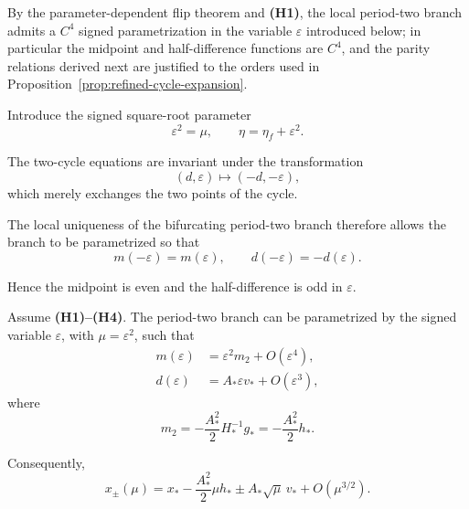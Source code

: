 By the parameter-dependent flip theorem
\cite{Kuznetsov2004,GuckenheimerHolmes1983} and \textbf{(H1)}, the
local period-two branch admits a $C^4$ signed parametrization in the
variable $\varepsilon$ introduced below; in particular the midpoint
and half-difference functions are $C^4$, and the parity relations
derived next are justified to the orders used in
Proposition~\ref{prop:refined-cycle-expansion}.

Introduce the signed square-root parameter
\begin{equation}
\varepsilon^2=\mu,
\qquad
\eta=\eta_f+\varepsilon^2.
\label{eq:epsilon-definition}
\end{equation}

The two-cycle equations are invariant under the transformation
\[
(d,\varepsilon)
\longmapsto
(-d,-\varepsilon),
\]
which merely exchanges the two points of the cycle.

The local uniqueness of the bifurcating period-two branch therefore
allows the branch to be parametrized so that
\begin{equation}
m(-\varepsilon)=m(\varepsilon),
\qquad
d(-\varepsilon)=-d(\varepsilon).
\label{eq:parity-md}
\end{equation}

Hence the midpoint is even and the half-difference is odd in
$\varepsilon$.

\begin{proposition}
\label{prop:refined-cycle-expansion}
Assume \textbf{(H1)--(H4)}.
The period-two branch can be parametrized by the signed variable
$\varepsilon$, with $\mu=\varepsilon^2$, such that
\begin{align}
m(\varepsilon)
&=
\varepsilon^2m_2
+
O(\varepsilon^4),
\label{eq:m-expansion}
\\
d(\varepsilon)
&=
A_*\varepsilon v_*
+
O(\varepsilon^3),
\label{eq:d-expansion}
\end{align}
where
\begin{equation}
m_2
=
-\frac{A_*^2}{2}H_*^{-1}g_*
=
-\frac{A_*^2}{2}h_*.
\label{eq:m2-formula}
\end{equation}

Consequently,
\begin{equation}
x_\pm(\mu)
=
x_*
-
\frac{A_*^2}{2}\mu h_*
\pm
A_*\sqrt{\mu}\,v_*
+
O(\mu^{3/2}).
\label{eq:refined-xpm-expansion}
\end{equation}
\end{proposition}

